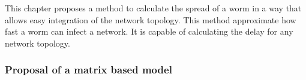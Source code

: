This chapter proposes a method to calculate the spread of a worm in a way that allows easy integration of the network topology. This method approximate how fast a worm can infect a network. It is capable of calculating the delay for any network topology. 


\subsubsection{Proposal of a matrix based model}


%




